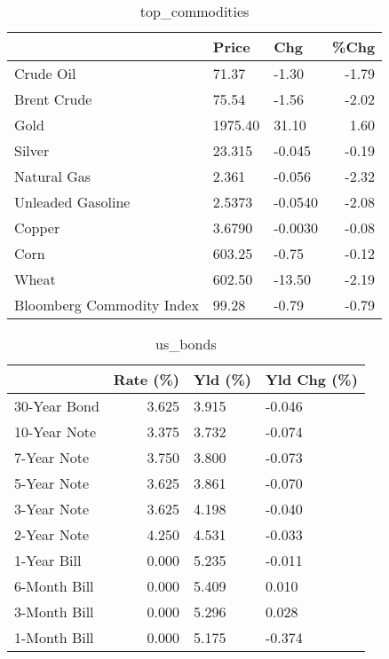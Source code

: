 \documentclass{article}%
\begin{document}
\begin{table}[htbp]%
\caption{top\_commodities}%
\centering%
\begin{adjustbox}{width=1\textwidth}%
\begin{tabular}{lllr}
\toprule
                          &   Price &     Chg &  \%Chg \\
\midrule
               Crude Oil  &   71.37 &   -1.30 & -1.79 \\
             Brent Crude  &   75.54 &   -1.56 & -2.02 \\
                    Gold  & 1975.40 &   31.10 &  1.60 \\
                  Silver  &  23.315 &  -0.045 & -0.19 \\
             Natural Gas  &   2.361 &  -0.056 & -2.32 \\
       Unleaded Gasoline  &  2.5373 & -0.0540 & -2.08 \\
                  Copper  &  3.6790 & -0.0030 & -0.08 \\
                    Corn  &  603.25 &   -0.75 & -0.12 \\
                   Wheat  &  602.50 &  -13.50 & -2.19 \\
Bloomberg Commodity Index &   99.28 &   -0.79 & -0.79 \\
\bottomrule
\end{tabular}
%
\end{adjustbox}%
\end{table}

%


\begin{table}[htbp]%
\caption{us\_bonds}%
\centering%
\begin{adjustbox}{width=1\textwidth}%
\begin{tabular}{lrll}
\toprule
             &  Rate (\%) & Yld (\%) & Yld Chg (\%) \\
\midrule
30-Year Bond &     3.625 &   3.915 &      -0.046 \\
10-Year Note &     3.375 &   3.732 &      -0.074 \\
 7-Year Note &     3.750 &   3.800 &      -0.073 \\
 5-Year Note &     3.625 &   3.861 &      -0.070 \\
 3-Year Note &     3.625 &   4.198 &      -0.040 \\
 2-Year Note &     4.250 &   4.531 &      -0.033 \\
 1-Year Bill &     0.000 &   5.235 &      -0.011 \\
6-Month Bill &     0.000 &   5.409 &       0.010 \\
3-Month Bill &     0.000 &   5.296 &       0.028 \\
1-Month Bill &     0.000 &   5.175 &      -0.374 \\
\bottomrule
\end{tabular}
%
\end{adjustbox}%
\end{table}
\end{document}
